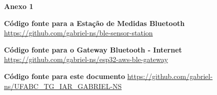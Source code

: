 \begin{centering}

\huge{\textbf{Anexo 1}}

\end{centering}
\vspace{50px}

\large{\textbf{Código fonte para a Estação de Medidas Bluetooth}} \newline
\url{https://github.com/gabriel-ns/ble-sensor-station}
\vspace{50px}

\large{\textbf{Código fonte para o Gateway Bluetooth - Internet}} \newline
\url{https://github.com/gabriel-ns/esp32-aws-ble-gateway}
\vspace{50px}


\large{\textbf{Código fonte para este documento}} \newline
\url{https://github.com/gabriel-ns/UFABC_TG_IAR_GABRIEL-NS}
\vspace{50px}

